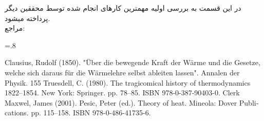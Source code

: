 در این قسمت به بررسی اولیه مهمترین کارهای انجام شده توسط محققین دیگر پرداخته میشود.\cite{Clausius}
\\
مراجع:
\begin{latin}
	\baselineskip=.8\baselineskip
	
	 Clausius, Rudolf (1850). "Über die bewegende Kraft der Wärme und die Gesetze, welche sich daraus für die Wärmelehre selbst ableiten lassen". Annalen der Physik. 155
	 Truesdell, C. (1980). The tragicomical history of thermodynamics 1822–1854. New York: Springer. pp. 78–85. ISBN 978-0-387-90403-0.
	 Clerk Maxwel, James (2001). Pesic, Peter (ed.). Theory of heat. Mineola: Dover Publications. pp. 115–158. ISBN 978-0-486-41735-6.
	
\end{latin}
